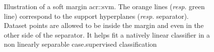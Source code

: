                 \begin{figure}
                    \centering
                    
                    \caption[
                        Illustration of a soft margin \acrshort*{acr::svm}.
                    ]{
                        \label{fig::soft_margin} Illustration of a soft margin \gls{acr::svm}.
                        The orange lines (\textit{resp.} green line) correspond to the support hyperplanes (\textit{resp.} separator).
                        Dataset points are allowed to be inside the margin and even in the other side of the separator.
                        It helps fit a natively linear classifier in a non linearly separable case.supervised classification
                    }
                \end{figure}

